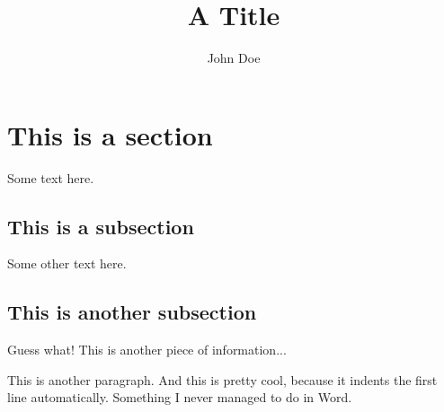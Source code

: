 \documentclass{article}
\title{A Title}
\author{John Doe}
\begin{document}
\maketitle

\section{This is a section}

Some text here.

\subsection{This is a subsection}

Some other text here.

\subsection{This is another subsection}

Guess what!
This is another piece of information...

This is another paragraph. And this is pretty cool, because
it indents the first line automatically. Something I never
managed to do in Word.
\end{document}
